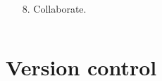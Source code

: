 \documentclass{beamer}
\begin{document}
\begin{frame}[t]
\begin{columns}
\begin{column}{.23\linewidth}
\begin{block}{}
\begin{minipage}[t][\blockheight][t]{\linewidth}
\begin{enumerate}
                    \end{enumerate}
                \end{minipage}
            \end{block}
            \begin{block}{}
                \begin{minipage}[t][\blockheight][t]{\linewidth}
                    \begin{enumerate}
                        \item[8.] Collaborate.
                    \end{enumerate}
                \end{minipage}
            \end{block}
        \end{column}
    \end{columns}
\end{frame}

\section{Version control}
\end{document}
